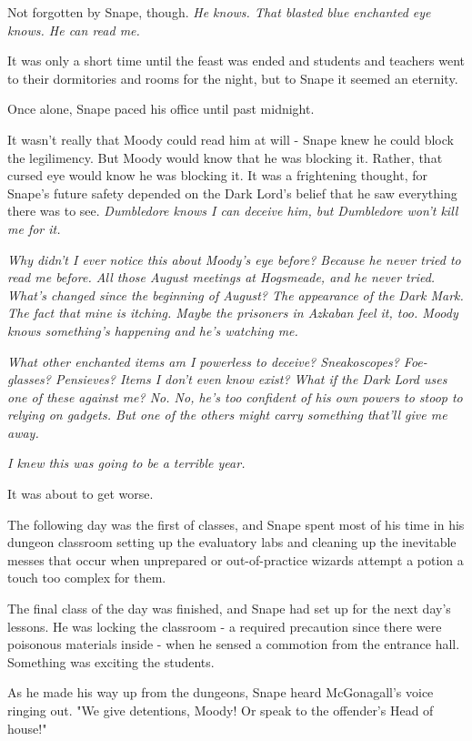 Not forgotten by Snape, though. \emph{He knows. That blasted blue enchanted eye knows. He can read me.}

It was only a short time until the feast was ended and students and teachers went to their dormitories and rooms for the night, but to Snape it seemed an eternity.

Once alone, Snape paced his office until past midnight.

It wasn't really that Moody could read him at will - Snape knew he could block the legilimency. But Moody would know that he was blocking it. Rather, that cursed eye would know he was blocking it. It was a frightening thought, for Snape's future safety depended on the Dark Lord's belief that he saw everything there was to see. \emph{Dumbledore knows I can deceive him, but Dumbledore won't kill me for it.}

\emph{Why didn't I ever notice this about Moody's eye before? Because he never tried to read me before. All those August meetings at Hogsmeade, and he never tried. What's changed since the beginning of August? The appearance of the Dark Mark. The fact that mine is itching. Maybe the prisoners in Azkaban feel it, too. Moody knows something's happening and he's watching me.}

\emph{What other enchanted items am I powerless to deceive? Sneakoscopes? Foe-glasses? Pensieves? Items I don't even know exist? What if the Dark Lord uses one of these against me? No. No, he's too confident of his own powers to stoop to relying on gadgets. But one of the others might carry something that'll give me away.}

\emph{I knew this was going to be a terrible year.}

It was about to get worse.

The following day was the first of classes, and Snape spent most of his time in his dungeon classroom setting up the evaluatory labs and cleaning up the inevitable messes that occur when unprepared or out-of-practice wizards attempt a potion a touch too complex for them.

The final class of the day was finished, and Snape had set up for the next day's lessons. He was locking the classroom - a required precaution since there were poisonous materials inside - when he sensed a commotion from the entrance hall. Something was exciting the students.

As he made his way up from the dungeons, Snape heard McGonagall's voice ringing out. "We give detentions, Moody! Or speak to the offender's Head of house!"

